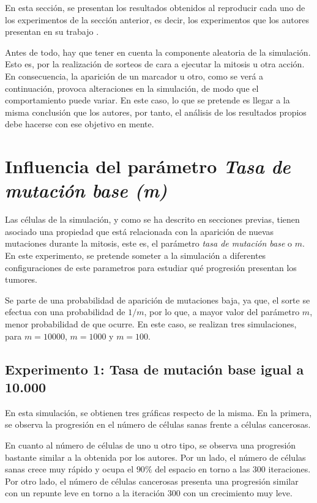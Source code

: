 En esta sección, se presentan los resultados obtenidos al reproducir cada uno de
los experimentos de la sección anterior, es decir, los experimentos que los autores
presentan en su trabajo \cite{jsantos-amonteagudo-1-2014}.

Antes de todo, hay que tener en cuenta la componente aleatoria de la simulación. Esto es, por
la realización de sorteos de cara a ejecutar la mitosis u otra acción. En consecuencia, la aparición
de un marcador u otro, como se verá a continuación, provoca alteraciones en la simulación, de modo que
el comportamiento puede variar. En este caso, lo que se pretende es llegar a la misma conclusión que los autores,
por tanto, el análisis de los resultados propios debe hacerse con ese objetivo en mente.

\section{Influencia del parámetro \textit{Tasa de mutación base (m)}}

Las células de la simulación, y como se ha descrito en secciones previas, tienen asociado una propiedad que está relacionada con la aparición
de nuevas mutaciones durante la mitosis, este es, el parámetro \textit{tasa de mutación base} o $m$. En este experimento,
se pretende someter a la simulación a diferentes configuraciones de este parametros para estudiar qué
progresión presentan los tumores.

Se parte de una probabilidad de aparición de mutaciones baja, ya que, el sorte se efectua con una probabilidad de
$1/m$, por lo que, a mayor valor del parámetro $m$, menor probabilidad de que ocurre. En este caso, se
realizan tres simulaciones, para $m=10000$, $m=1000$ y $m=100$.

\subsection{Experimento 1: Tasa de mutación base igual a 10.000}

En esta simulación, se obtienen tres gráficas respecto de la misma. En la primera, se observa la progresión
en el número de células sanas frente a células cancerosas.

En cuanto al número de células de uno u otro tipo, se observa una progresión bastante similar a la obtenida por los autores.
Por un lado, el número de células sanas crece muy rápido y ocupa el $90\%$ del espacio en torno a las $300$ iteraciones. Por otro lado,
el número de células cancerosas presenta una progresión similar con un repunte leve en torno a la iteración $300$ con un crecimiento muy leve.

